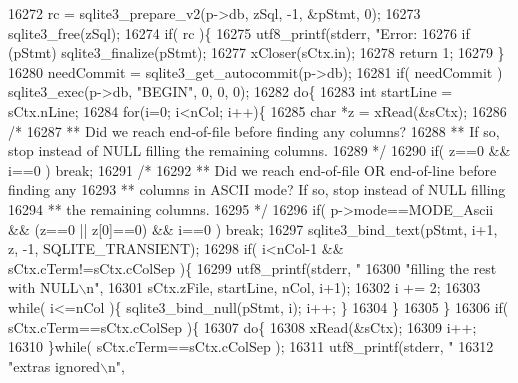 \begin{DoxyCode}
{{{{{{{{{{{{{{{{{{{{{{{{{{{{{{{{16272     rc = sqlite3_prepare_v2(p->db, zSql, -1, &pStmt, 0);
16273     sqlite3_free(zSql);
16274     \textcolor{keywordflow}{if}( rc )\{
16275       utf8_printf(stderr, \textcolor{stringliteral}{"Error: %
16276       \textcolor{keywordflow}{if} (pStmt) sqlite3_finalize(pStmt);
16277       xCloser(sCtx.in);
16278       \textcolor{keywordflow}{return} 1;
16279     \}
16280     needCommit = sqlite3_get_autocommit(p->db);
16281     \textcolor{keywordflow}{if}( needCommit ) sqlite3_exec(p->db, \textcolor{stringliteral}{"BEGIN"}, 0, 0, 0);
16282     \textcolor{keywordflow}{do}\{
16283       \textcolor{keywordtype}{int} startLine = sCtx.nLine;
16284       \textcolor{keywordflow}{for}(i=0; i<nCol; i++)\{
16285         \textcolor{keywordtype}{char} *z = xRead(&sCtx);
16286         \textcolor{comment}{/*}
16287 \textcolor{comment}{        ** Did we reach end-of-file before finding any columns?}
16288 \textcolor{comment}{        ** If so, stop instead of NULL filling the remaining columns.}
16289 \textcolor{comment}{        */}
16290         \textcolor{keywordflow}{if}( z==0 && i==0 ) \textcolor{keywordflow}{break};
16291         \textcolor{comment}{/*}
16292 \textcolor{comment}{        ** Did we reach end-of-file OR end-of-line before finding any}
16293 \textcolor{comment}{        ** columns in ASCII mode?  If so, stop instead of NULL filling}
16294 \textcolor{comment}{        ** the remaining columns.}
16295 \textcolor{comment}{        */}
16296         \textcolor{keywordflow}{if}( p->mode==MODE_Ascii && (z==0 || z[0]==0) && i==0 ) \textcolor{keywordflow}{break};
16297         sqlite3_bind_text(pStmt, i+1, z, -1, SQLITE_TRANSIENT);
16298         \textcolor{keywordflow}{if}( i<nCol-1 && sCtx.cTerm!=sCtx.cColSep )\{
16299           utf8_printf(stderr, \textcolor{stringliteral}{"%
16300                           \textcolor{stringliteral}{"filling the rest with NULL\(\backslash\)n"},
16301                           sCtx.zFile, startLine, nCol, i+1);
16302           i += 2;
16303           \textcolor{keywordflow}{while}( i<=nCol )\{ sqlite3_bind_null(pStmt, i); i++; \}
16304         \}
16305       \}
16306       \textcolor{keywordflow}{if}( sCtx.cTerm==sCtx.cColSep )\{
16307         \textcolor{keywordflow}{do}\{
16308           xRead(&sCtx);
16309           i++;
16310         \}\textcolor{keywordflow}{while}( sCtx.cTerm==sCtx.cColSep );
16311         utf8_printf(stderr, \textcolor{stringliteral}{"%
16312                         \textcolor{stringliteral}{"extras ignored\(\backslash\)n"},
}}}}}}}}}}}}}}}}}}}}}}}}}}}}}}}}}}}
\end{DoxyCode}
